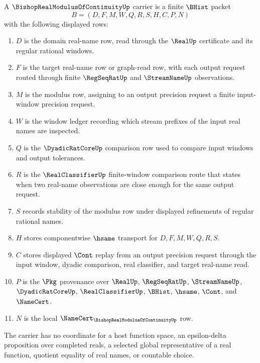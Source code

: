 \begin{definition}
\label{def:bishop-real-modulus-of-continuity-carrier}
A $\BishopRealModulusOfContinuityUp$ carrier is a finite $\BHist$ packet
$$
B=(D,F,M,W,Q,R,S,H,C,P,N)
$$
with the following displayed rows:
\begin{enumerate}
\item $D$ is the domain real-name row, read through the $\RealUp$ certificate and its regular rational windows.
\item $F$ is the target real-name row or graph-read row, with each output request routed through finite $\RegSeqRatUp$ and $\StreamNameUp$ observations.
\item $M$ is the modulus row, assigning to an output precision request a finite input-window precision request.
\item $W$ is the window ledger recording which stream prefixes of the input real names are inspected.
\item $Q$ is the $\DyadicRatCoreUp$ comparison row used to compare input windows and output tolerances.
\item $R$ is the $\RealClassifierUp$ finite-window comparison route that states when two real-name observations are close enough for the same output request.
\item $S$ records stability of the modulus row under displayed refinements of regular rational names.
\item $H$ stores componentwise $\hsame$ transport for $D,F,M,W,Q,R,S$.
\item $C$ stores displayed $\Cont$ replay from an output precision request through the input window, dyadic comparison, real classifier, and target real-name read.
\item $P$ is the $\Pkg$ provenance over $\RealUp$, $\RegSeqRatUp$, $\StreamNameUp$, $\DyadicRatCoreUp$, $\RealClassifierUp$, $\BHist$, $\hsame$, $\Cont$, and $\NameCert$.
\item $N$ is the local $\NameCert_{\BishopRealModulusOfContinuityUp}$ row.
\end{enumerate}
The carrier has no coordinate for a host function space, an epsilon-delta proposition over completed reals, a selected global representative of a real function, quotient equality of real names, or countable choice.
\end{definition}

